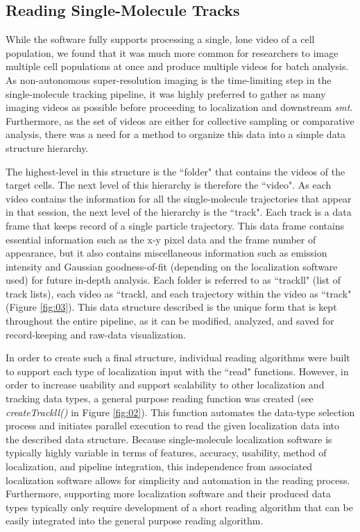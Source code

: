 \documentclass{bioinfo}
\begin{document}
\subsection{Reading Single-Molecule Tracks}

While the software fully supports processing a single, lone video of a cell population, we found that it was much more common for researchers to image multiple cell populations at once and produce multiple videos for batch analysis. As non-autonomous super-resolution imaging is the time-limiting step in the single-molecule tracking pipeline, it was highly preferred to gather as many imaging videos as possible before proceeding to localization and downstream \textit{smt}. Furthermore, as the set of videos are either for collective sampling or comparative analysis, there was a need for a method to organize this data into a simple data structure hierarchy.

The highest-level in this structure is the ``folder" that contains the videos of the target cells. The next level of this hierarchy is therefore the ``video". As each video contains the information for all the single-molecule trajectories that appear in that session, the next level of the hierarchy is the ``track". Each track is a data frame that keeps record of a single particle trajectory. This data frame contains essential information such as the x-y pixel data and the frame number of appearance, but it also contains miscellaneous information such as emission intensity and Gaussian goodness-of-fit (depending on the localization software used) for future in-depth analysis. Each folder is referred to as ``trackll" (list of track lists), each video as ``trackl, and each trajectory within the video as ``track" (Figure \ref{fig:03}). This data structure described is the unique form that is kept throughout the entire pipeline, as it can be modified, analyzed, and saved for record-keeping and raw-data visualization.

In order to create such a final structure, individual reading algorithms were built to support each type of localization input with the ``read" functions. However, in order to increase usability and support scalability to other localization and tracking data types, a general purpose reading function was created (see \textit{createTrackll()} in Figure \ref{fig:02}). This function automates the data-type selection process and initiates parallel execution to read the given localization data into the described data structure. Because single-molecule localization software is typically highly variable in terms of features, accuracy, usability, method of localization, and pipeline integration, this independence from associated localization software allows for simplicity and automation in the reading process. Furthermore, supporting more localization software and their produced data types typically only require development of a short reading algorithm that can be easily integrated into the general purpose reading algorithm.
\end{document}
